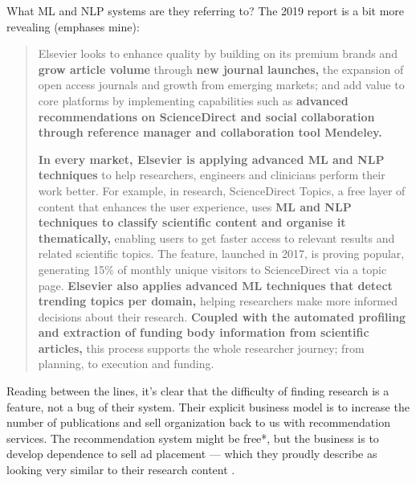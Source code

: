 \documentclass[notoc]{tufte-book}
\begin{document}
What ML and NLP systems are they referring to? The 2019 report is a bit
more revealing (emphases mine):

\begin{quote}
Elsevier looks to enhance quality by building on its premium brands and
\textbf{grow article volume} through \textbf{new journal launches,} the
expansion of open access journals and growth from emerging markets; and
add value to core platforms by implementing capabilities such as
\textbf{advanced recommendations on ScienceDirect and social
collaboration through reference manager and collaboration tool
Mendeley.}

\textbf{In every market, Elsevier is applying advanced ML and NLP
techniques} to help researchers, engineers and clinicians perform their
work better. For example, in research, ScienceDirect Topics, a free
layer of content that enhances the user experience, uses \textbf{ML and
NLP techniques to classify scientific content and organise it
thematically,} enabling users to get faster access to relevant results
and related scientific topics. The feature, launched in 2017, is proving
popular, generating 15\% of monthly unique visitors to ScienceDirect via
a topic page. \textbf{Elsevier also applies advanced ML techniques that
detect trending topics per domain,} helping researchers make more
informed decisions about their research. \textbf{Coupled with the
automated profiling and extraction of funding body information from
scientific articles,} this process supports the whole researcher
journey; from planning, to execution and funding. \citep{RELXAnnualReport2019} 
\end{quote}

Reading between the lines, it's clear that the difficulty of finding
research is a feature, not a bug of their system. Their explicit
business model is to increase the number of publications and sell
organization back to us with recommendation services. The recommendation
system might be free*, but the business is to develop dependence to sell
ad placement --- which they proudly describe as looking very similar to
their research content \citep{springernatureBrandedContent, elsevier360AdvertisingSolutions} .
\end{document}
